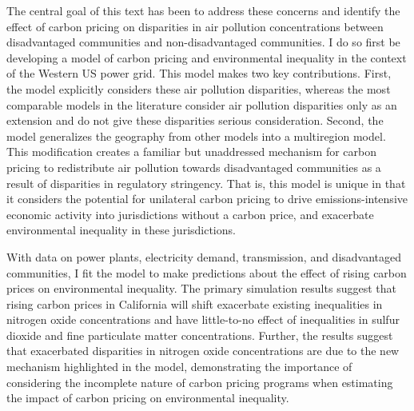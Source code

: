 The central goal of this text has been to address these concerns and identify the effect of carbon pricing on disparities in air pollution concentrations between disadvantaged communities and non-disadvantaged communities. I do so first be developing a model of carbon pricing and environmental inequality in the context of the Western US power grid. This model makes two key contributions. First, the model explicitly considers these air pollution disparities, whereas the most comparable models in the literature consider air pollution disparities only as an extension and do not give these disparities serious consideration. Second, the model generalizes the geography from other models into a multiregion model. This modification creates a familiar but unaddressed mechanism for carbon pricing to redistribute air pollution towards disadvantaged communities as a result of disparities in regulatory stringency. That is, this model is unique in that it considers the potential for unilateral carbon pricing to drive emissions-intensive economic activity into jurisdictions without a carbon price, and exacerbate environmental inequality in these jurisdictions. 

With data on power plants, electricity demand, transmission, and disadvantaged communities, I fit the model to make predictions about the effect of rising carbon prices on environmental inequality. The primary simulation results suggest that rising carbon prices in California will shift exacerbate existing inequalities in nitrogen oxide concentrations and have little-to-no effect of inequalities in sulfur dioxide and fine particulate matter concentrations. Further, the results suggest that exacerbated disparities in nitrogen oxide concentrations are due to the new mechanism highlighted in the model, demonstrating the importance of considering the incomplete nature of carbon pricing programs when estimating the impact of carbon pricing on environmental inequality. 

